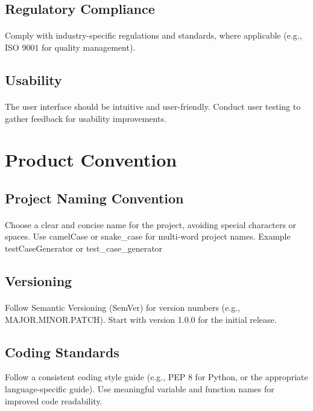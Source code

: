 \documentclass{article}
\begin{document}
\subsection{Regulatory Compliance}
\paragraph{}
Comply with industry-specific regulations and standards, where applicable (e.g., ISO 9001 for quality management).

\subsection{Usability}
\paragraph{}
The user interface should be intuitive and user-friendly.
Conduct user testing to gather feedback for usability improvements.


\section{Product Convention}
\subsection{Project Naming Convention}
\paragraph{}
Choose a clear and concise name for the project, avoiding special characters or spaces.
Use camelCase or snake\_case for multi-word project names.
Example\: testCaseGenerator or test\_case\_generator

\subsection{Versioning}
\paragraph{}
Follow Semantic Versioning (SemVer) for version numbers (e.g., MAJOR.MINOR.PATCH).
Start with version 1.0.0 for the initial release.

\subsection{Coding Standards}
Follow a consistent coding style guide (e.g., PEP 8 for Python, or the appropriate
language-specific guide). Use meaningful variable and function names for improved
code readability.
\end{document}
